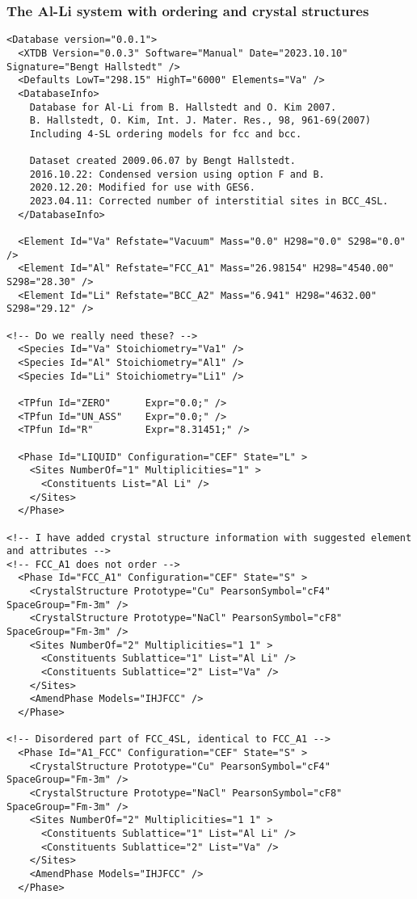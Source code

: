 \documentclass{article}
\begin{document}
\begin{appendices}
\subsubsection{The Al-Li system with ordering and crystal structures}\label{sec:alli1}

\begin{verbatim}
<Database version="0.0.1">
  <XTDB Version="0.0.3" Software="Manual" Date="2023.10.10" Signature="Bengt Hallstedt" />
  <Defaults LowT="298.15" HighT="6000" Elements="Va" />
  <DatabaseInfo>
    Database for Al-Li from B. Hallstedt and O. Kim 2007.
	B. Hallstedt, O. Kim, Int. J. Mater. Res., 98, 961-69(2007)
	Including 4-SL ordering models for fcc and bcc.
	
    Dataset created 2009.06.07 by Bengt Hallstedt.
    2016.10.22: Condensed version using option F and B.
    2020.12.20: Modified for use with GES6.
    2023.04.11: Corrected number of interstitial sites in BCC_4SL.
  </DatabaseInfo>

  <Element Id="Va" Refstate="Vacuum" Mass="0.0" H298="0.0" S298="0.0" />
  <Element Id="Al" Refstate="FCC_A1" Mass="26.98154" H298="4540.00" S298="28.30" />
  <Element Id="Li" Refstate="BCC_A2" Mass="6.941" H298="4632.00" S298="29.12" />

<!-- Do we really need these? -->
  <Species Id="Va" Stoichiometry="Va1" />
  <Species Id="Al" Stoichiometry="Al1" />
  <Species Id="Li" Stoichiometry="Li1" />

  <TPfun Id="ZERO"      Expr="0.0;" />
  <TPfun Id="UN_ASS"    Expr="0.0;" />
  <TPfun Id="R"         Expr="8.31451;" />

  <Phase Id="LIQUID" Configuration="CEF" State="L" >
    <Sites NumberOf="1" Multiplicities="1" >
      <Constituents List="Al Li" />
    </Sites>
  </Phase>

<!-- I have added crystal structure information with suggested element and attributes -->
<!-- FCC_A1 does not order -->
  <Phase Id="FCC_A1" Configuration="CEF" State="S" >
	<CrystalStructure Prototype="Cu" PearsonSymbol="cF4" SpaceGroup="Fm-3m" />
	<CrystalStructure Prototype="NaCl" PearsonSymbol="cF8" SpaceGroup="Fm-3m" />
    <Sites NumberOf="2" Multiplicities="1 1" >
      <Constituents Sublattice="1" List="Al Li" />
      <Constituents Sublattice="2" List="Va" />
    </Sites>
    <AmendPhase Models="IHJFCC" />
  </Phase>

<!-- Disordered part of FCC_4SL, identical to FCC_A1 -->
  <Phase Id="A1_FCC" Configuration="CEF" State="S" >
	<CrystalStructure Prototype="Cu" PearsonSymbol="cF4" SpaceGroup="Fm-3m" />
	<CrystalStructure Prototype="NaCl" PearsonSymbol="cF8" SpaceGroup="Fm-3m" />
    <Sites NumberOf="2" Multiplicities="1 1" >
      <Constituents Sublattice="1" List="Al Li" />
      <Constituents Sublattice="2" List="Va" />
    </Sites>
    <AmendPhase Models="IHJFCC" />
  </Phase>


\end{verbatim}
\end{appendices}
\end{document}

